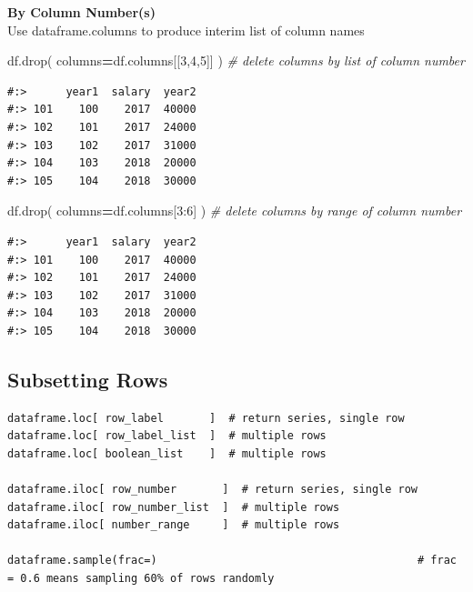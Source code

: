 \documentclass[
]{book}
\newenvironment{Shaded}{\begin{snugshade}}{\end{snugshade}}
\newcommand{\CommentTok}[1]{\textcolor[rgb]{0.37,0.37,0.37}{\textit{#1}}}
\newcommand{\DecValTok}[1]{\textcolor[rgb]{0.06,0.06,0.06}{#1}}
\newcommand{\NormalTok}[1]{#1}
\newcommand{\OperatorTok}[1]{\textcolor[rgb]{0.43,0.43,0.43}{\textbf{#1}}}
\begin{document}
\textbf{By Column Number(s)}\\
Use dataframe.columns to produce interim list of column names

\begin{Shaded}
\begin{Highlighting}[]
\NormalTok{df.drop( columns}\OperatorTok{=}\NormalTok{df.columns[[}\DecValTok{3}\NormalTok{,}\DecValTok{4}\NormalTok{,}\DecValTok{5}\NormalTok{]] )   }\CommentTok{# delete columns by list of column number}
\end{Highlighting}
\end{Shaded}

\begin{verbatim}
#:>      year1  salary  year2
#:> 101    100    2017  40000
#:> 102    101    2017  24000
#:> 103    102    2017  31000
#:> 104    103    2018  20000
#:> 105    104    2018  30000
\end{verbatim}

\begin{Shaded}
\begin{Highlighting}[]
\NormalTok{df.drop( columns}\OperatorTok{=}\NormalTok{df.columns[}\DecValTok{3}\NormalTok{:}\DecValTok{6}\NormalTok{] )       }\CommentTok{# delete columns by range of column number}
\end{Highlighting}
\end{Shaded}

\begin{verbatim}
#:>      year1  salary  year2
#:> 101    100    2017  40000
#:> 102    101    2017  24000
#:> 103    102    2017  31000
#:> 104    103    2018  20000
#:> 105    104    2018  30000
\end{verbatim}

\hypertarget{subsetting-rows}{%
\subsection{Subsetting Rows}\label{subsetting-rows}}

\begin{verbatim}
dataframe.loc[ row_label       ]  # return series, single row
dataframe.loc[ row_label_list  ]  # multiple rows
dataframe.loc[ boolean_list    ]  # multiple rows

dataframe.iloc[ row_number       ]  # return series, single row
dataframe.iloc[ row_number_list  ]  # multiple rows
dataframe.iloc[ number_range     ]  # multiple rows

dataframe.sample(frac=)                                        # frac = 0.6 means sampling 60% of rows randomly
\end{verbatim}
\end{document}
